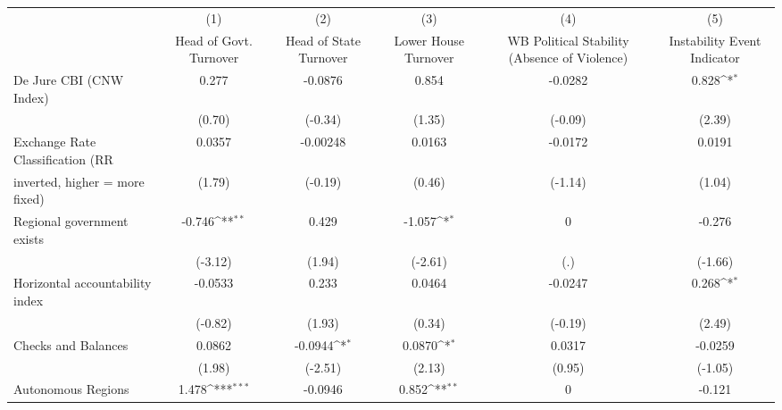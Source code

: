 {
\def\sym#1{\ifmmode^{#1}\else\(^{#1}\)\fi}
\begin{tabular}{l*{5}{c}}
\toprule
                                        &\multicolumn{1}{c}{(1)}&\multicolumn{1}{c}{(2)}&\multicolumn{1}{c}{(3)}&\multicolumn{1}{c}{(4)}&\multicolumn{1}{c}{(5)}\\
                                        &\multicolumn{1}{c}{Head of Govt. Turnover}&\multicolumn{1}{c}{Head of State Turnover}&\multicolumn{1}{c}{Lower House Turnover}&\multicolumn{1}{c}{WB Political Stability (Absence of Violence)}&\multicolumn{1}{c}{Instability Event Indicator}\\
\midrule
De Jure CBI (CNW Index)                 &     0.277         &   -0.0876         &     0.854         &   -0.0282         &     0.828\sym{*}  \\
                                        &    (0.70)         &   (-0.34)         &    (1.35)         &   (-0.09)         &    (2.39)         \\
\addlinespace
Exchange Rate Classification (RR        &    0.0357         &  -0.00248         &    0.0163         &   -0.0172         &    0.0191         \\
inverted, higher = more fixed)          &    (1.79)         &   (-0.19)         &    (0.46)         &   (-1.14)         &    (1.04)         \\
\addlinespace
Regional government exists              &    -0.746\sym{**} &     0.429         &    -1.057\sym{*}  &         0         &    -0.276         \\
                                        &   (-3.12)         &    (1.94)         &   (-2.61)         &       (.)         &   (-1.66)         \\
\addlinespace
Horizontal accountability index         &   -0.0533         &     0.233         &    0.0464         &   -0.0247         &     0.268\sym{*}  \\
                                        &   (-0.82)         &    (1.93)         &    (0.34)         &   (-0.19)         &    (2.49)         \\
\addlinespace
Checks and Balances                     &    0.0862         &   -0.0944\sym{*}  &    0.0870\sym{*}  &    0.0317         &   -0.0259         \\
                                        &    (1.98)         &   (-2.51)         &    (2.13)         &    (0.95)         &   (-1.05)         \\
\addlinespace
Autonomous Regions                      &     1.478\sym{***}&   -0.0946         &     0.852\sym{**} &         0         &    -0.121         \\

\end{tabular}}
